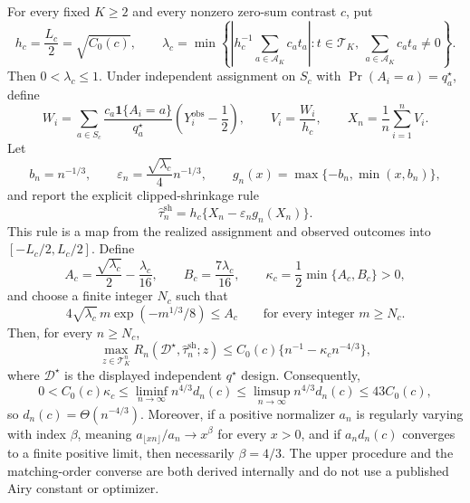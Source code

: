 For every fixed \(K\geq2\) and every nonzero zero-sum contrast \(c\), put
\[
 h_c=\frac{L_c}{2}=\sqrt{C_0(c)},
 \qquad
 \lambda_c=\min\left\{
 \left|h_c^{-1}\sum_{a\in\mathcal A_K}c_at_a\right|:
 t\in\mathcal T_K,\ \sum_{a\in\mathcal A_K}c_at_a\neq0
 \right\}.
\]
Then \(0<\lambda_c\leq1\). Under independent assignment on \(S_c\) with \(\Pr(A_i=a)=q_a^\star\), define
\[
 W_i=\sum_{a\in S_c}\frac{c_a\mathbf 1\{A_i=a\}}{q_a^\star}
 \left(Y_i^{\mathrm{obs}}-\frac12\right),
 \qquad V_i=\frac{W_i}{h_c},
 \qquad X_n=\frac1n\sum_{i=1}^nV_i.
\]
Let
\[
 b_n=n^{-1/3},\qquad
 \varepsilon_n=\frac{\sqrt{\lambda_c}}4n^{-1/3},\qquad
 g_n(x)=\max\{-b_n,\min(x,b_n)\},
\]
and report the explicit clipped-shrinkage rule
\[
 \widehat\tau_n^{\mathrm{sh}}=h_c\{X_n-\varepsilon_ng_n(X_n)\}.
\]
This rule is a map from the realized assignment and observed outcomes into \([-L_c/2,L_c/2]\). Define
\[
 A_c=\frac{\sqrt{\lambda_c}}2-\frac{\lambda_c}{16},
 \qquad B_c=\frac{7\lambda_c}{16},
 \qquad \kappa_c=\frac12\min\{A_c,B_c\}>0,
\]
and choose a finite integer \(N_c\) such that
\[
 4\sqrt{\lambda_c}\,m\exp(-m^{1/3}/8)\leq A_c
 \qquad\text{for every integer }m\geq N_c.
\]
Then, for every \(n\geq N_c\),
\[
 \max_{z\in\mathcal T_K^n}
 R_n(\mathcal D^\star,\widehat\tau_n^{\mathrm{sh}};z)
 \leq C_0(c)\{n^{-1}-\kappa_cn^{-4/3}\},
\]
where \(\mathcal D^\star\) is the displayed independent \(q^\star\) design. Consequently,
\[
 0<C_0(c)\kappa_c
 \leq\liminf_{n\to\infty}n^{4/3}d_n(c)
 \leq\limsup_{n\to\infty}n^{4/3}d_n(c)
 \leq43C_0(c),
\]
so \(d_n(c)=\Theta(n^{-4/3})\). Moreover, if a positive normalizer \(a_n\) is regularly varying with index \(\beta\), meaning \(a_{\lfloor xn\rfloor}/a_n\to x^\beta\) for every \(x>0\), and if \(a_nd_n(c)\) converges to a finite positive limit, then necessarily \(\beta=4/3\). The upper procedure and the matching-order converse are both derived internally and do not use a published Airy constant or optimizer.